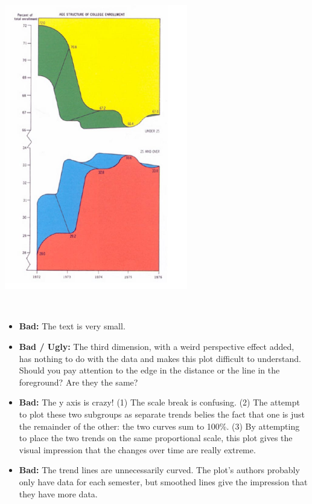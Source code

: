 \documentclass[
]{book}
\providecommand{\tightlist}{%
  \setlength{\itemsep}{0pt}\setlength{\parskip}{0pt}}
\begin{document}
\includegraphics[width=0.6\textwidth,height=\textheight]{img/vis8.jpeg}

~

\begin{itemize}
\tightlist
\item
  \textbf{Bad:} The text is very small.
\item
  \textbf{Bad / Ugly:} The third dimension, with a weird perspective effect added, has nothing to do with the data and makes this plot difficult to understand. Should you pay attention to the edge in the distance or the line in the foreground? Are they the same?\\
\item
  \textbf{Bad:} The y axis is crazy! (1) The scale break is confusing. (2) The attempt to plot these two subgroups as separate trends belies the fact that one is just the remainder of the other: the two curves sum to 100\%. (3) By attempting to place the two trends on the same proportional scale, this plot gives the visual impression that the changes over time are really extreme.
\item
  \textbf{Bad:} The trend lines are unnecessarily curved. The plot's authors probably only have data for each semester, but smoothed lines give the impression that they have more data.
\end{itemize}

~\\
\end{document}
